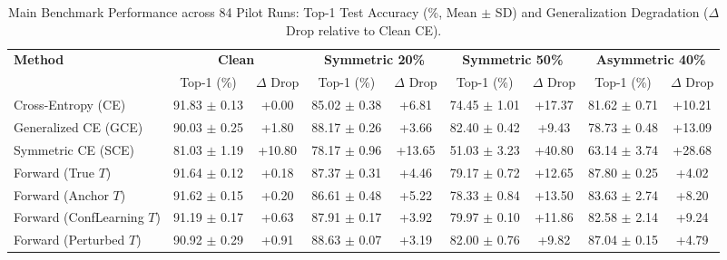 \begin{table}[t]
\centering
\caption{Main Benchmark Performance across 84 Pilot Runs: Top-1 Test Accuracy (\%, Mean $\pm$ SD) and Generalization Degradation ($\Delta$ Drop relative to Clean CE).}
\label{tab:main_performance}
\small
\setlength{\tabcolsep}{3.5pt}
\begin{tabular}{lcccccccc}
\hline
\textbf{Method} & \multicolumn{2}{c}{\textbf{Clean}} & \multicolumn{2}{c}{\textbf{Symmetric 20\%}} & \multicolumn{2}{c}{\textbf{Symmetric 50\%}} & \multicolumn{2}{c}{\textbf{Asymmetric 40\%}} \\
 & Top-1 (\%) & $\Delta$ Drop & Top-1 (\%) & $\Delta$ Drop & Top-1 (\%) & $\Delta$ Drop & Top-1 (\%) & $\Delta$ Drop \\
\hline
Cross-Entropy (CE) & 91.83 $\pm$ 0.13 & +0.00 & 85.02 $\pm$ 0.38 & +6.81 & 74.45 $\pm$ 1.01 & +17.37 & 81.62 $\pm$ 0.71 & +10.21 \\
Generalized CE (GCE) & 90.03 $\pm$ 0.25 & +1.80 & 88.17 $\pm$ 0.26 & +3.66 & 82.40 $\pm$ 0.42 & +9.43 & 78.73 $\pm$ 0.48 & +13.09 \\
Symmetric CE (SCE) & 81.03 $\pm$ 1.19 & +10.80 & 78.17 $\pm$ 0.96 & +13.65 & 51.03 $\pm$ 3.23 & +40.80 & 63.14 $\pm$ 3.74 & +28.68 \\
Forward (True $T$) & 91.64 $\pm$ 0.12 & +0.18 & 87.37 $\pm$ 0.31 & +4.46 & 79.17 $\pm$ 0.72 & +12.65 & 87.80 $\pm$ 0.25 & +4.02 \\
Forward (Anchor $T$) & 91.62 $\pm$ 0.15 & +0.20 & 86.61 $\pm$ 0.48 & +5.22 & 78.33 $\pm$ 0.84 & +13.50 & 83.63 $\pm$ 2.74 & +8.20 \\
Forward (ConfLearning $T$) & 91.19 $\pm$ 0.17 & +0.63 & 87.91 $\pm$ 0.17 & +3.92 & 79.97 $\pm$ 0.10 & +11.86 & 82.58 $\pm$ 2.14 & +9.24 \\
Forward (Perturbed $T$) & 90.92 $\pm$ 0.29 & +0.91 & 88.63 $\pm$ 0.07 & +3.19 & 82.00 $\pm$ 0.76 & +9.82 & 87.04 $\pm$ 0.15 & +4.79 \\
\hline
\end{tabular}
\end{table}
